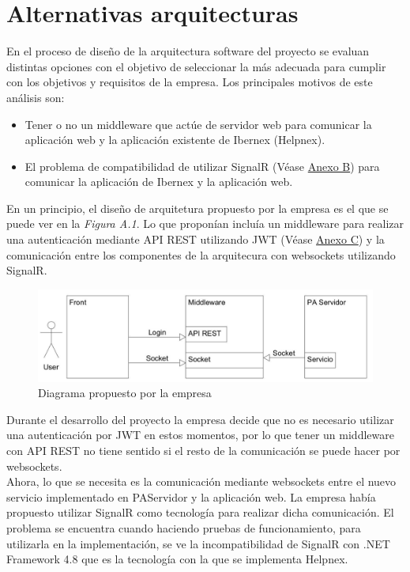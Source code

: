 \chapter{Alternativas arquitecturas}
\label{anexo-a}

En el proceso de diseño de la arquitectura software del proyecto se evaluan distintas opciones con el objetivo de seleccionar la más adecuada para cumplir con los objetivos y requisitos de la empresa. Los principales motivos de este análisis son:

\begin{itemize}
    \item Tener o no un middleware que actúe de servidor web para comunicar la aplicación web y la aplicación existente de Ibernex (Helpnex).
    \item El problema de compatibilidad de utilizar SignalR (Véase  \hyperref[anexo-b]{Anexo B}) para comunicar la aplicación de Ibernex y la aplicación web.
\end{itemize}

En un principio, el diseño de arquitetura propuesto por la empresa es el que se puede ver en la \textit{Figura A.1}. Lo que proponían incluía un middleware para realizar una autenticación mediante API REST utilizando JWT (Véase \hyperref[anexo-c]{Anexo C}) y la comunicación entre los componentes de la arquitecura con websockets utilizando SignalR.  

\begin{figure}[!h]
    \centering
    \includegraphics[width=15cm]{Imagenes/Descripcion-arquitectura}
    \caption{Diagrama propuesto por la empresa}
    \label{fig:descripcion-arquitectura}
\end{figure}

Durante el desarrollo del proyecto la empresa decide que no es necesario utilizar una autenticación por JWT en estos momentos, por lo que tener un middleware con API REST no tiene sentido si el resto de la comunicación se puede hacer por websockets.\\

Ahora, lo que se necesita es la comunicación mediante websockets entre el nuevo servicio implementado en PAServidor y la aplicación web. La empresa había propuesto utilizar SignalR como tecnología para realizar dicha comunicación. El problema se encuentra cuando haciendo pruebas de funcionamiento, para utilizarla en la implementación, se ve la incompatibilidad de SignalR con .NET Framework 4.8 que es la tecnología con la que se implementa Helpnex.\\

